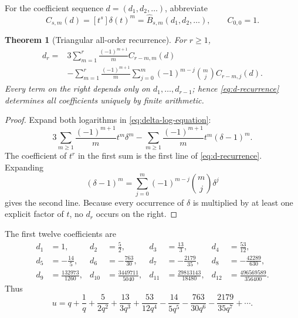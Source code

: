 \documentclass[11pt]{article}
\numberwithin{equation}{section}
\theoremstyle{mainthm}
\newtheorem{theorem}{Theorem}[section]
\theoremstyle{defstyle}
\theoremstyle{remark}
\begin{document}
For the coefficient sequence \(d=(d_1,d_2,\ldots)\), abbreviate
\begin{equation}\label{eq:C-r-m-def}
 C_{s,m}(d)=[t^s]\delta(t)^m
 =\widehat B_{s,m}(d_1,d_2,\ldots),
 \qquad C_{0,0}=1.
\end{equation}

\begin{theorem}[Triangular all-order recurrence]\label{thm:d-recurrence}
For \(r\ge1\),
\begin{equation}\label{eq:d-recurrence}
 \boxed{
 \begin{aligned}
 d_r={}&3\sum_{m=1}^{r}\frac{(-1)^{m+1}}m C_{r-m,m}(d)\\
 &-\sum_{m=1}^{r}\frac{(-1)^{m+1}}m
 \sum_{j=0}^{m}(-1)^{m-j}\binom mj C_{r-m,j}(d).
 \end{aligned}}
\end{equation}
Every term on the right depends only on \(d_1,\ldots,d_{r-1}\); hence \eqref{eq:d-recurrence} determines all coefficients uniquely by finite arithmetic.
\end{theorem}

\begin{proof}
Expand both logarithms in \eqref{eq:delta-log-equation}:
\[
 3\sum_{m\ge1}\frac{(-1)^{m+1}}m t^m\delta^m
 -\sum_{m\ge1}\frac{(-1)^{m+1}}m t^m(\delta-1)^m.
\]
The coefficient of \(t^r\) in the first sum is the first line of \eqref{eq:d-recurrence}.  Expanding
\[
 (\delta-1)^m=\sum_{j=0}^m(-1)^{m-j}\binom mj\delta^j
\]
gives the second line.  Because every occurrence of \(\delta\) is multiplied by at least one explicit factor of \(t\), no \(d_r\) occurs on the right.
\end{proof}

The first twelve coefficients are
\begin{equation}\label{eq:d-values}
\begin{aligned}
 d_1&=1,&
 d_2&=\frac52,&
 d_3&=\frac{13}{3},&
 d_4&=\frac{53}{12},\\
 d_5&=-\frac{14}{5},&
 d_6&=-\frac{763}{30},&
 d_7&=-\frac{2179}{35},&
 d_8&=-\frac{42289}{630},\\
 d_9&=\frac{132973}{1260},&
 d_{10}&=\frac{3449711}{5040},&
 d_{11}&=\frac{29813143}{18480},&
 d_{12}&=\frac{496569589}{356400}.
\end{aligned}
\end{equation}
Thus
\begin{equation}\label{eq:u-q-expanded}
 u=q+\frac1q+\frac{5}{2q^2}+\frac{13}{3q^3}
 +\frac{53}{12q^4}-\frac{14}{5q^5}
 -\frac{763}{30q^6}-\frac{2179}{35q^7}+\cdots.
\end{equation}
\end{document}
